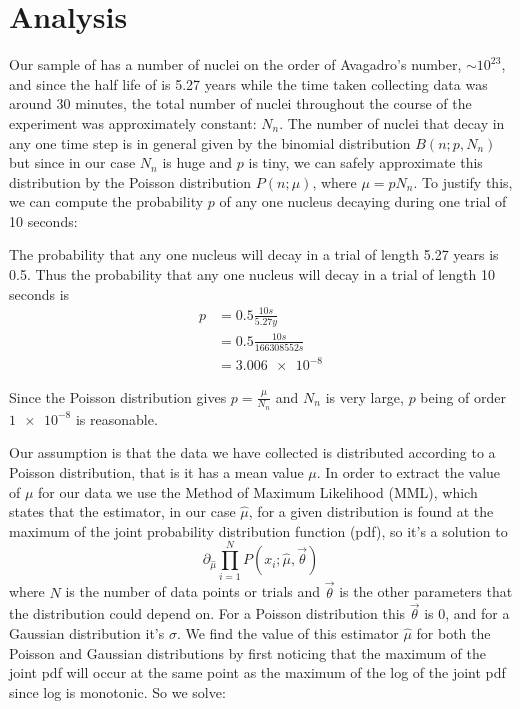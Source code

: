 \documentclass[12pt]{article}
\numberwithin{equation}{section}
\numberwithin{figure}{section}
\numberwithin{table}{section}
\begin{document}
\section{Analysis}\label{sec:Analysis}
\par Our sample of  has a number of nuclei on the order of Avagadro's number, $\sim 10^{23}$, and since the half life of  is 5.27 years \cite{manual} while the time taken collecting data was around 30 minutes, the total number of nuclei throughout the course of the experiment was approximately constant: $N_n$. The number of nuclei that decay in any one time step is in general given by the binomial distribution $B(n;p,N_n)$ but since in our case $N_n$ is huge and $p$ is tiny, we can safely approximate this distribution by the Poisson distribution $P(n;\mu)$, where $\mu=pN_n$. To justify this, we can compute the probability $p$ of any one nucleus decaying during one trial of 10 seconds:
\par The probability that any one nucleus will decay in a trial of length 5.27 years is 0.5. Thus the probability that any one nucleus will decay in a trial of length 10 seconds is
\begin{align*}
    p&=0.5\frac{10s}{5.27y}\\
    &=0.5\frac{10s}{166308552s}\\
    &=\num{3.006e-8}
\end{align*}
\par Since the Poisson distribution gives $p=\frac{\mu}{N_n}$ and $N_n$ is very large, $p$ being of order $\num{1e-8}$ is reasonable. 
\par Our assumption is that the data we have collected is distributed according to a Poisson distribution, that is it has a mean value $\mu$. In order to extract the value of $\mu$ for our data we use the Method of Maximum Likelihood (MML), which states that the estimator, in our case $\hat\mu$, for a given distribution is found at the maximum of the joint probability distribution function (pdf), so it's a solution to 
\begin{equation}
    \partial_{\hat\mu}\prod_{i=1}^N P(x_i;\hat\mu,\vec{\theta})
    \label{eqn:Joint PDF}
\end{equation}
where $N$ is the number of data points or trials and $\vec{\theta}$ is the other parameters that the distribution could depend on. For a Poisson distribution this $\vec{\theta}$ is 0, and for a Gaussian distribution it's $\sigma$. We find the value of this estimator $\hat\mu$ for both the Poisson and Gaussian distributions by first noticing that the maximum of the joint pdf will occur at the same point as the maximum of the log of the joint pdf since log is monotonic. So we solve:
\end{document}
